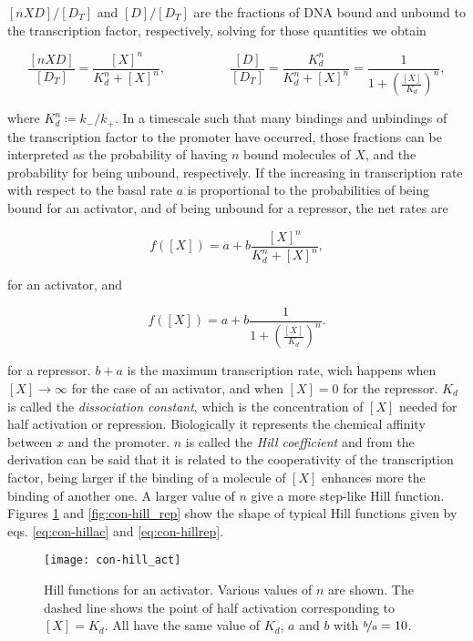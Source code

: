 $[nXD]/[D_T]$ and $[D]/[D_T]$ are the fractions of DNA bound and unbound to the transcription factor, respectively, solving for those quantities we obtain

\begin{equation*}
  \frac{[nXD]}{[D_T]} = \frac{[X]^n}{K_d^n+[X]^n}, \quad\quad\quad\quad\quad  \frac{[D]}{[D_T]} = \frac{K_d^n}{K_d^n+[X]^n} = \frac{1}{1+\left(\frac{[X]}{K_d}\right)^n},
\end{equation*}

where $K_d^n \coloneqq k_-/k_+$. In a timescale such that many bindings and unbindings of the transcription factor to the promoter have occurred, those fractions can be interpreted as the probability of having $n$ bound molecules of $X$, and the probability for being unbound, respectively. If the increasing in transcription rate with respect to the basal rate $a$ is proportional to the probabilities of being bound for an activator, and of being unbound for a repressor, the net rates are

\begin{equation}
  \label{eq:con-hillac}
  f([X]) = a + b \frac{[X]^n}{K_d^n+[X]^n},
\end{equation}

for an activator, and

\begin{equation}
  \label{eq:con-hillrep}
  f([X]) = a + b \frac{1}{1+\left(\frac{[X]}{K_d}\right)^n}.
\end{equation}

for a repressor. $b+a$ is the maximum transcription rate, wich happens when $[X]\rightarrow\infty$ for the case of an activator, and when $[X]=0$ for the repressor. $K_d$ is called the \textit{dissociation constant}, which is the concentration of $[X]$ needed for half activation or repression. Biologically it represents the chemical affinity between $x$ and the promoter.  $n$ is called the \textit{Hill coefficient} and from the derivation can be said that it is related to the cooperativity of the transcription factor, being larger if the binding of a molecule of $[X]$ enhances more the binding of another one. A larger value of $n$ give a more step-like Hill function. Figures \ref{fig:con-hill_act} and \ref{fig:con-hill_rep} show the shape of typical Hill functions given by eqs. \eqref{eq:con-hillac} and \eqref{eq:con-hillrep}.

\begin{figure}[H]
  \centering
  \texttt{[image: con-hill\_act]}
  \caption[Hill function for an activator]{\label{fig:con-hill_act} Hill functions for an activator. Various values of $n$ are shown. The dashed line shows the point of half activation corresponding to $[X]=K_d$. All have the same value of $K_d$, $a$ and $b$ with $\nicefrac{b}{a}=10$.}
\end{figure}

